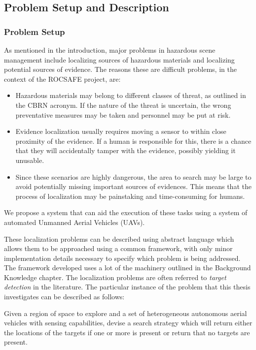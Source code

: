 \subsection{Problem Setup and Description}
\subsubsection{Problem Setup}
As mentioned in the introduction, major problems in hazardous scene management include localizing sources of hazardous materials and localizing potential sources of evidence. The reasons these are difficult problems, in the context of the ROCSAFE project, are:
\begin{itemize}
    \item Hazardous materials may belong to different classes of threat, as outlined in the CBRN acronym. If the nature of the threat is uncertain, the wrong preventative measures may be taken and personnel may be put at risk. 
    \item Evidence localization usually requires moving a sensor to within close proximity of the evidence. If a human is responsible for this, there is a chance that they will accidentally tamper with the evidence, possibly yielding it unusable.
    \item Since these scenarios are highly dangerous, the area to search may be large to avoid potentially missing important sources of evidences. This means that the process of localization may be painstaking and time-consuming for humans.
\end{itemize}
We propose a system that can aid the execution of these tasks using a system of automated Unmanned Aerial Vehicles (UAVs). \par

These localization problems can be described using abstract language which allows them to be approached using a common framework, with only minor implementation details necessary to specify which problem is being addressed. The framework developed uses a lot of the machinery outlined in the Background Knowledge chapter. The localization problems are often referred to \textit{target detection} in the literature. The particular instance of the problem that this thesis investigates can be described as follows: \newline

Given a region of space to explore and a set of heterogeneous autonomous aerial vehicles with sensing capabilities, devise a search strategy which will return either the locations of the targets if one or more is present or return that no targets are present. \par

